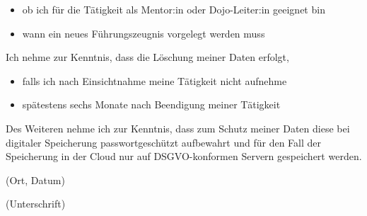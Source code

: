 \documentclass[11pt]{article}
\newcommand{\hint}[1]{{\footnotesize\color{gray}#1}}
\newlength{\tfl}%
\newcommand{\TextFieldFill}[2][]{%
    \setlength{\tfl}{\linewidth}%
    \settowidth{\dimen0}{#2}%
    \addtolength{\tfl}{-\dimen0}%
    \addtolength{\tfl}{-1em}%
    \TextField[#1, bordercolor={}, backgroundcolor={}, width=\tfl]{#2}%
}
\begin{document}
    \begin{itemize}
        \item ob ich für die Tätigkeit als Mentor:in oder Dojo-Leiter:in geeignet bin
        \item wann ein neues Führungszeugnis vorgelegt werden muss
    \end{itemize}

    Ich nehme zur Kenntnis, dass die Löschung meiner Daten erfolgt,

    \begin{itemize}
        \item falls ich nach Einsichtnahme meine Tätigkeit nicht aufnehme
        \item spätestens sechs Monate nach Beendigung meiner Tätigkeit
    \end{itemize}

    Des Weiteren nehme ich zur Kenntnis, dass zum Schutz meiner Daten diese bei digitaler Speicherung passwortgeschützt aufbewahrt und für den Fall der Speicherung in der Cloud nur auf DSGVO-konformen Servern gespeichert werden.

    \vspace{2cm}

    \begin{minipage}{0.4\textwidth}
        \TextFieldFill[name=dateplace]{}
        \hint{(Ort, Datum)}
    \end{minipage}
    \begin{minipage}{0.6\textwidth}
        \vspace{1.2em}
        \hrulefill

        \hint{(Unterschrift)}
    \end{minipage}
\end{document}
